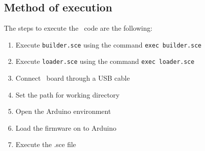 \subsection{Method of execution }
The steps to execute the \scilab\ code are the following:
\begin{enumerate}
\item Execute {\tt builder.sce} using the command {\tt exec
    builder.sce}
\item Execute {\tt loader.sce} using the command {\tt exec loader.sce}
\item Connect \arduino\ board through a USB cable
\item Set the path for working directory
\item Open the Arduino environment
\item Load the firmware on to Arduino
\item Execute the {.sce} file
\end{enumerate}
